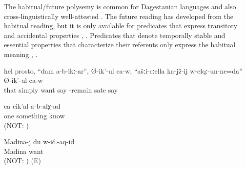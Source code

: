 The habitual/future polysemy is common for Dagestanian languages \citep{Tatevosov2005} and also cross-linguistically well-attested \citep{Haspelmath1998}. The future reading has developed from the habitual reading, but it is only available for predicates that express transitory and accidental properties , . Predicates that denote temporally stable and essential properties that characterize their referents only express the habitual meaning , .
%
\begin{exe}
	\ex	\label{ex:I do not want to sit with you}
	\gll	hel	prosto,	``dam	a-b-ikː-ar'', Ø-ik'-ul ca-w,	``ašːi-cːella ka-jž-ij w-elqː-un-ne=da''	Ø-ik'-ul	ca-w\\
		that	simply		want	say			-remain sate say	\\
	\glt	{}

	\ex	\label{ex:I don't know anything}
	\gll	ca	cik'al	a-b-alχ-ad\\
		one	something	know\\
	\glt	{} (NOT: )

	\ex	\label{ex:Madina loves me}
	\gll	Madina-j	du	w-ičː-aq-id\\
		Madina		want\\
	\glt	{} (NOT: ) (E)
\end{exe}

